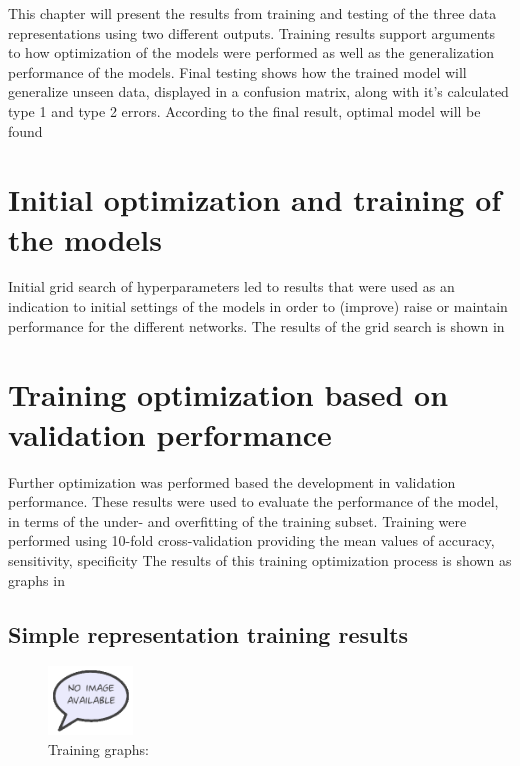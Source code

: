 \documentclass[12pt,a4paper]{article}
\author{Mads Kristensen}
\begin{document}
This chapter will present the results from training and testing of the three data representations using two different outputs. Training results support arguments to how optimization of the models were performed as well as the generalization performance of the models. Final testing shows how the trained model will generalize unseen data, displayed in a confusion matrix, along with it's calculated type 1 and type 2 errors. According to the final result, optimal model will be found

\section{Initial optimization and training of the models}
Initial grid search of hyperparameters led to results that were used as an indication to initial settings of the models in order to (improve) raise or maintain performance for the different networks. The results of the grid search is shown in %


\section{Training optimization based on validation performance}
Further optimization was performed based the development in validation performance. These results were used to evaluate the performance of the model, in terms of the under- and overfitting of the training subset. Training were performed using 10-fold cross-validation providing the mean values of accuracy, sensitivity, specificity The results of this training optimization process is shown as graphs in %

\subsection{Simple representation training results}
\begin{figure} [H]
\centering
\includegraphics[width=0.2\textwidth]{figures/missimage}
\caption{Training graphs: }
\label{fig:simpleGraph}  
\end{figure}
\end{document}
